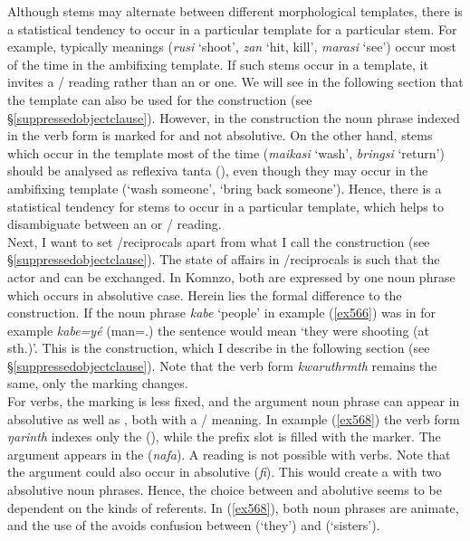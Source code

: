 Although stems may alternate between different morphological templates, there is a statistical tendency to occur in a particular template for a particular stem. For example, typically  meanings (\emph{rusi} `shoot', \emph{zan} `hit, kill', \emph{marasi} `see') occur most of the time in the ambifixing  template. If such stems occur in a  template, it invites a / reading rather than an  or  one. We will see in the following section that the  template can also be used for the  construction (see \S{}\ref{suppressedobjectclause}). However, in the  construction the noun phrase indexed in the verb form is marked for   and not absolutive. On the other hand, stems which occur in the  template most of the time (\emph{maikasi} `wash', \emph{bringsi} `return') should be analysed as reflexiva tanta (\citealt{Geniusienie:1987refl}), even though they may occur in the ambifixing  template (`wash someone', `bring back someone'). Hence, there is a statistical tendency for stems to occur in a particular template, which helps to disambiguate between an  or / reading.\\

Next, I want to set /reciprocals apart from what I call the  construction (see \S{}\ref{suppressedobjectclause}). The state of affairs in /reciprocals is such that the actor and  can be exchanged. In Komnzo, both are expressed by one noun phrase which occurs in absolutive case. Herein lies the formal difference to the  construction. If the noun phrase \emph{kabe} `people' in example (\ref{ex566}) was in   \textendash{} for example \emph{kabe=yé} (man=\Erg.\Nsg{}) \textendash{} the sentence would mean `they were shooting (at sth.)'. This is the  construction, which I describe in the following section (see \S{}\ref{suppressedobjectclause}). Note that the verb form \emph{kwaruthrmth} remains the same, only the  marking changes.\\

For  verbs, the  marking is less fixed, and the argument noun phrase can appear in absolutive as well as  , both with a / meaning. In example (\ref{ex568}) the verb form \emph{ŋarinth} indexes only the  (\Stdu), while the prefix slot is filled with the  marker. The  argument appears in the  (\emph{nafa}). A  reading is not possible with  verbs. Note that the argument could also occur in absolutive  (\emph{fi}). This would create a  with two absolutive noun phrases. Hence, the choice between  and abolutive seems to be dependent on the kinds of referents. In (\ref{ex568}), both noun phrases are animate, and the use of the   avoids confusion between  (`they') and  (`sisters').


